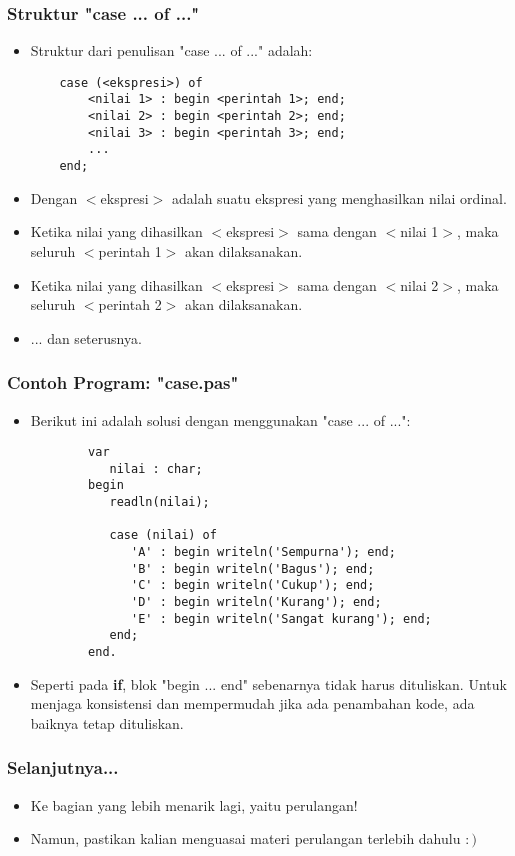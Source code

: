 \documentclass{beamer}
\begin{document}
\begin{frame}[fragile]
\frametitle{Struktur "case ... of ..."}
\begin{itemize}
	\item Struktur dari penulisan "case ... of ..." adalah:
	\begin{lstlisting}
	case (<ekspresi>) of
	    <nilai 1> : begin <perintah 1>; end;
	    <nilai 2> : begin <perintah 2>; end;
	    <nilai 3> : begin <perintah 3>; end;
	    ...
	end;
	\end{lstlisting}
	
	\item Dengan $<$ekspresi$>$ adalah suatu ekspresi yang menghasilkan \alert{nilai ordinal}.
	\item Ketika nilai yang dihasilkan $<$ekspresi$>$ sama dengan $<$nilai 1$>$, maka seluruh $<$perintah 1$>$ akan dilaksanakan.
	\item Ketika nilai yang dihasilkan $<$ekspresi$>$ sama dengan $<$nilai 2$>$, maka seluruh $<$perintah 2$>$ akan dilaksanakan.
	\item ... dan seterusnya.
\end{itemize}
\end{frame}

\begin{frame}[fragile]
\frametitle{Contoh Program: "case.pas"}
\begin{itemize}
	\item Berikut ini adalah solusi dengan menggunakan "case ... of ...":
	\begin{lstlisting}
		var
		   nilai : char;
		begin
		   readln(nilai);
		
		   case (nilai) of
		      'A' : begin writeln('Sempurna'); end;
		      'B' : begin writeln('Bagus'); end;
		      'C' : begin writeln('Cukup'); end;
		      'D' : begin writeln('Kurang'); end;
		      'E' : begin writeln('Sangat kurang'); end;
		   end;
		end.
	\end{lstlisting}
	\item Seperti pada \textbf{if}, blok "begin ... end" sebenarnya tidak harus dituliskan. Untuk menjaga konsistensi dan mempermudah jika ada penambahan kode, ada baiknya tetap dituliskan.
\end{itemize}
\end{frame}

\begin{frame}
\frametitle{Selanjutnya...}
\begin{itemize}
	\item Ke bagian yang lebih menarik lagi, yaitu perulangan!
	\item Namun, pastikan kalian menguasai materi perulangan terlebih dahulu $:)$
\end{itemize}
\end{frame}
\end{document}
